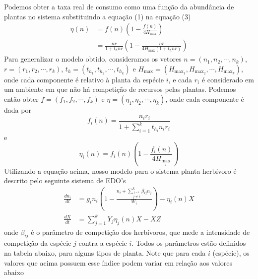 \documentclass{article}
\begin{document}
Podemos obter a taxa real de consumo como uma função da abundância de plantas no sistema substituindo a equação (1) na equação (3)
\begin{align}
    \eta(n) &= f(n)\left(1 - \frac{f(n)}{4H_{\max}}\right) \nonumber \\
            &= \frac{n r}{1 + t_h n r} \left( 1 - \frac{n r}{4H_{\max}(1 + t_h n r)} \right)
\end{align}
Para generalizar o modelo obtido, consideramos os vetores $n = (n_1,n_2,\cdots,n_k)$, $r = (r_1,r_2,\cdots,r_k)$, $t_h = (t_{h_1},t_{h_2},\cdots,t_{h_k})$ e $H_{\max} = (H_{\max_1}, H_{\max_2},\cdots,H_{\max_k})$, onde cada componente é relativo à planta da espécie $i$, e cada $r_i$ é considerado em um ambiente em que não há competição de recursos pelas plantas. Podemos então obter $f = (f_1,f_2,\cdots,f_k)$ e $\eta = (\eta_1,\eta_2,\cdots,\eta_k)$, onde cada componente é dada por
\begin{equation}
    f_i(n) = \frac{n_i r_i}{1 + \sum_{i=1}^{k} t_{h_i} n_i r_i}
\end{equation}
e
\begin{equation}
    \eta_i(n)  = f_i(n)\left(1 - \frac{f_i(n)}{4H_{\max_i}}\right)
\end{equation}
Utilizando a equação acima, nosso modelo para o sistema planta-herbívoro é descrito pelo seguinte sistema de EDO's
\begin{equation}
\begin{aligned}
    \frac{dn_i}{dt} &= g_i n_i \left( 1 - \frac{n_i + \sum_{\overset{j=1}{j \neq i}}^k \beta_{ij}n_j}{W_i} \right) - \eta_i(n)X \\
    \frac{dX}{dt}   &= \sum_{j=1}^k Y_j\eta_j(n)X - XZ
\end{aligned}
\end{equation}
onde $\beta_{ij}$ é o parâmetro de competição dos herbívoros, que mede a intensidade de competição da espécie $j$ contra a espécie $i$. Todos os parâmetros estão definidos na tabela abaixo, para alguns tipos de planta. Note que para cada $i$ (espécie), os valores que acima possuem esse índice podem variar em relação aos valores abaixo
\end{document}
